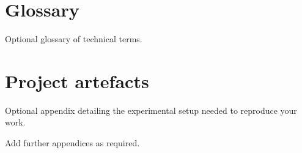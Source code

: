 
\chapter{Glossary}
Optional glossary of technical terms.

\chapter{Project artefacts}
Optional appendix detailing the experimental setup needed to reproduce your work. 

Add further appendices as required.
